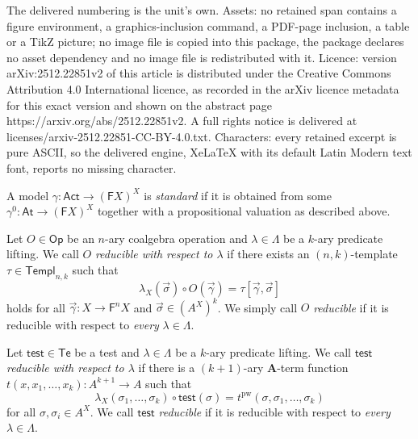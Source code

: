 \documentclass[10pt,a4paper]{amsart}
\newcommand{\Act}{\mathsf{Act}}
\newcommand{\AtAct}{\mathsf{At}}
\newcommand{\CoOp}{\mathsf{Op}}
\newcommand{\Pred}{\Lambda}
\newcommand{\TeOp}{\mathsf{Te}}
\newcommand{\alg}[1]{\mathbf{#1}}
\newcommand{\func}[1]{\mathsf{#1}}
\newcommand{\nkTempl}{\mathsf{Templ}_{n,k}}
\newcommand{\test}{\mathsf{test}}
\begin{document}
The delivered numbering is the unit's own. Assets: no retained span contains a figure environment, a graphics-inclusion command, a PDF-page inclusion, a table or a TikZ picture; no image file is copied into this package, the package declares no asset dependency and no image file is redistributed with it. Licence: version arXiv:2512.22851v2 of this article is distributed under the Creative Commons Attribution 4.0 International licence, as recorded in the arXiv licence metadata for this exact version and shown on the abstract page https://arxiv.org/abs/2512.22851v2. A full rights notice is delivered at licenses/arxiv-2512.22851-CC-BY-4.0.txt. Characters: every retained excerpt is pure ASCII, so the delivered engine, XeLaTeX with its default Latin Modern text font, reports no missing character.
\begin{defi}\label{definition:StandardModel}
A model $\gamma \colon \Act \to (\func{F}X)^X$ is \emph{standard} if it is obtained from some $\gamma^0 \colon \AtAct \to (\func{F}X)^X$ together with a propositional valuation as described above. 
\end{defi} 

\begin{defi}\label{definition:ReducibleCoalgOperation}
Let $O\in \CoOp$ be an $n$-ary coalgebra operation and $\lambda \in \Pred$ be a $k$-ary predicate lifting. We call $O$ \emph{reducible with respect to $\lambda$} if there exists an $(n, k)$-template $\tau \in \nkTempl$ such that 
$$
\lambda_X(\vec{\sigma}) \circ O(\vec{\gamma}) = \tau[\vec{\gamma}, \vec{\sigma}]
$$   
holds for all $\vec{\gamma}\colon X {\to} \func{F}^n X$ and $\vec{\sigma} \in  (A^X)^k $. We simply call $O$ \emph{reducible} if it is reducible with respect to \emph{every} $\lambda \in \Pred$. 
\end{defi} 

\begin{defi}\label{definition:Reducibletest}
Let $\test \in \TeOp$ be a test and $\lambda \in \Pred$ be a $k$-ary predicate lifting. We call $\test$ \emph{reducible with respect to $\lambda$} if there is a $(k+1)$-ary $\alg{A}$-term function $t(x, x_1, \dots, x_k) \colon A^{k+1} \to A$ such that 
$$
\lambda_X(\sigma_1, \dots, \sigma_k) \circ \test(\sigma) = t^\mathrm{pw}(\sigma, \sigma_1, \dots, \sigma_k)$$
for all $\sigma, \sigma_i \in A^X$. We call $\test$ \emph{reducible} if it is reducible with respect to \emph{every} $\lambda \in \Pred$.  
\end{defi} 
\end{document}
